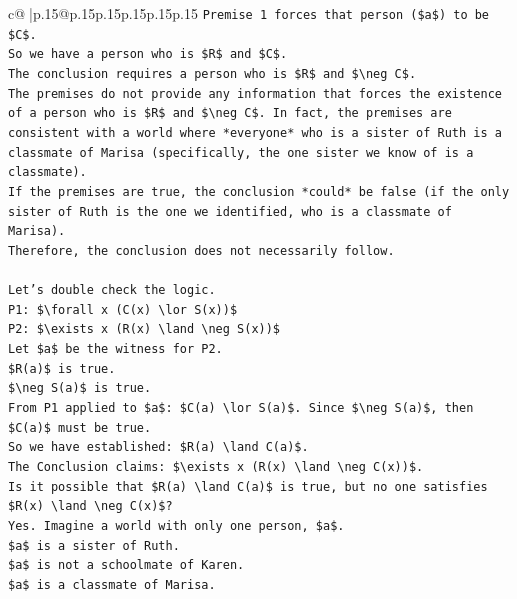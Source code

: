 \documentclass{article}
\begin{document}
{\begin{supertabular}{c@{$\;$}|p{.15\linewidth}@{}p{.15\linewidth}p{.15\linewidth}p{.15\linewidth}p{.15\linewidth}p{.15\linewidth}}
{{{\texttt{Premise 1 forces that person (\$a\$) to be \$C\$.} \\
\texttt{So we have a person who is \$R\$ and \$C\$.} \\
\texttt{The conclusion requires a person who is \$R\$ and \$\textbackslash{}neg C\$.} \\
\texttt{The premises do not provide any information that forces the existence of a person who is \$R\$ and \$\textbackslash{}neg C\$. In fact, the premises are consistent with a world where *everyone* who is a sister of Ruth is a classmate of Marisa (specifically, the one sister we know of is a classmate).} \\
\texttt{If the premises are true, the conclusion *could* be false (if the only sister of Ruth is the one we identified, who is a classmate of Marisa).} \\
\texttt{Therefore, the conclusion does not necessarily follow.} \\
\\ 
\texttt{Let's double check the logic.} \\
\texttt{P1: \$\textbackslash{}forall x (C(x) \textbackslash{}lor S(x))\$} \\
\texttt{P2: \$\textbackslash{}exists x (R(x) \textbackslash{}land \textbackslash{}neg S(x))\$} \\
\texttt{Let \$a\$ be the witness for P2.} \\
\texttt{\$R(a)\$ is true.} \\
\texttt{\$\textbackslash{}neg S(a)\$ is true.} \\
\texttt{From P1 applied to \$a\$: \$C(a) \textbackslash{}lor S(a)\$. Since \$\textbackslash{}neg S(a)\$, then \$C(a)\$ must be true.} \\
\texttt{So we have established: \$R(a) \textbackslash{}land C(a)\$.} \\
\texttt{The Conclusion claims: \$\textbackslash{}exists x (R(x) \textbackslash{}land \textbackslash{}neg C(x))\$.} \\
\texttt{Is it possible that \$R(a) \textbackslash{}land C(a)\$ is true, but no one satisfies \$R(x) \textbackslash{}land \textbackslash{}neg C(x)\$?} \\
\texttt{Yes. Imagine a world with only one person, \$a\$.} \\
\texttt{\$a\$ is a sister of Ruth.} \\
\texttt{\$a\$ is not a schoolmate of Karen.} \\
\texttt{\$a\$ is a classmate of Marisa.} \\
}}}
\end{supertabular}}
\end{document}
